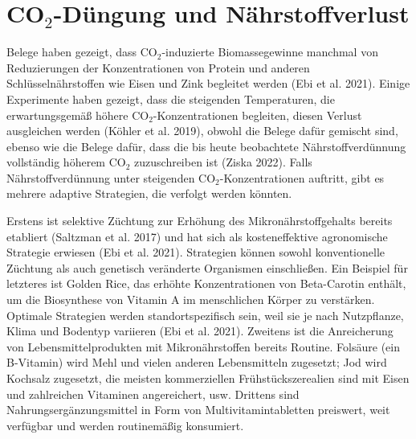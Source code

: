 \documentclass[12pt,paper=a4,DIV=12,parskip=never,chapterprefix=false,headings=standardclasses]{scrreprt}
\begin{document}
\section{CO$_2$-Düngung und Nährstoffverlust}
Belege haben gezeigt, dass CO$_2$-induzierte Biomassegewinne manchmal von Reduzierungen der Konzentrationen von Protein und anderen Schlüsselnährstoffen wie Eisen und Zink begleitet werden (Ebi et al. 2021). Einige Experimente haben gezeigt, dass die steigenden Temperaturen, die erwartungsgemäß höhere CO$_2$-Konzentrationen begleiten, diesen Verlust ausgleichen werden (Köhler et al. 2019), obwohl die Belege dafür gemischt sind, ebenso wie die Belege dafür, dass die bis heute beobachtete Nährstoffverdünnung vollständig höherem CO$_2$ zuzuschreiben ist (Ziska 2022). Falls Nährstoffverdünnung unter steigenden CO$_2$-Konzentrationen auftritt, gibt es mehrere adaptive Strategien, die verfolgt werden könnten.

Erstens ist selektive Züchtung zur Erhöhung des Mikronährstoffgehalts bereits etabliert (Saltzman et al. 2017) und hat sich als kosteneffektive agronomische Strategie erwiesen (Ebi et al. 2021). Strategien können sowohl konventionelle Züchtung als auch genetisch veränderte Organismen einschließen. Ein Beispiel für letzteres ist Golden Rice, das erhöhte Konzentrationen von Beta-Carotin enthält, um die Biosynthese von Vitamin A im menschlichen Körper zu verstärken. Optimale Strategien werden standortspezifisch sein, weil sie je nach Nutzpflanze, Klima und Bodentyp variieren (Ebi et al. 2021).
Zweitens ist die Anreicherung von Lebensmittelprodukten mit Mikronährstoffen bereits Routine. Folsäure (ein B-Vitamin) wird Mehl und vielen anderen Lebensmitteln zugesetzt; Jod wird Kochsalz zugesetzt, die meisten kommerziellen Frühstückszerealien sind mit Eisen und zahlreichen Vitaminen angereichert, usw. Drittens sind Nahrungsergänzungsmittel in Form von Multivitamintabletten preiswert, weit verfügbar und werden routinemäßig konsumiert.
\end{document}
